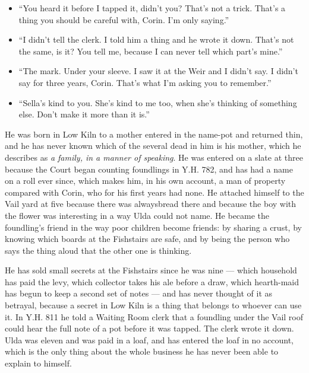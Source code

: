 \documentclass{design/chronicle}
\begin{document}
{\begin{itemize}[leftmargin=1.4em,itemsep=1pt,topsep=3pt,parsep=0pt]
\item “You heard it before I tapped it, didn’t you? That’s not a trick. That’s a thing you should be careful with, Corin. I’m only saying.”

\item “I didn’t tell the clerk. I told him a thing and he wrote it down. That’s not the same, is it? You tell me, because I can never tell which part’s mine.”

\item “The mark. Under your sleeve. I saw it at the Weir and I didn’t say. I didn’t say for three years, Corin. That’s what I’m asking you to remember.”

\item “Sella’s kind to you. She’s kind to me too, when she’s thinking of something else. Don’t make it more than it is.”

\end{itemize}

He was born in Low Kiln to a mother entered in the name-pot and returned thin, and he has never known which of the several dead in him is his mother, which he describes as \emph{a family, in a manner of speaking}. He was entered on a slate at three because the Court began counting foundlings in Y.H. 782, and has had a name on a roll ever since, which makes him, in his own account, a man of property compared with Corin, who for his first years had none. He attached himself to the Vail yard at five because there was alwaysbread there and because the boy with the flower was interesting in a way Ulda could not name. He became the foundling’s friend in the way poor children become friends: by sharing a crust, by knowing which boards at the Fishstairs are safe, and by being the person who says the thing aloud that the other one is thinking.

He has sold small secrets at the Fishstairs since he was nine — which household has paid the levy, which collector takes his ale before a draw, which hearth-maid has begun to keep a second set of notes — and has never thought of it as betrayal, because a secret in Low Kiln is a thing that belongs to whoever can use it. In Y.H. 811 he told a Waiting Room clerk that a foundling under the Vail roof could hear the full note of a pot before it was tapped. The clerk wrote it down. Ulda was eleven and was paid in a loaf, and has entered the loaf in no account, which is the only thing about the whole business he has never been able to explain to himself.

}
\end{document}
